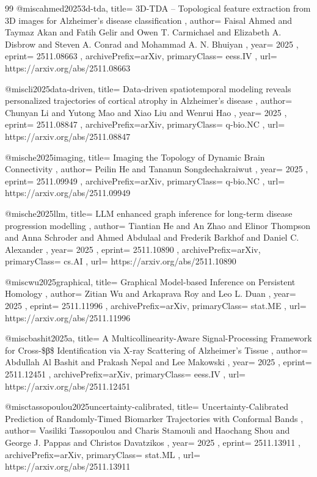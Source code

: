 \documentclass[11pt,a4paper]{article}
\begin{document}
\begin{thebibliography}{99}
@misc{ahmed20253d-tda,
  title={ 3D-TDA -- Topological feature extraction from 3D images for Alzheimer's disease classification },
  author={ Faisal Ahmed and Taymaz Akan and Fatih Gelir and Owen T. Carmichael and Elizabeth A. Disbrow and Steven A. Conrad and Mohammad A. N. Bhuiyan },
  year={ 2025 },
  eprint={ 2511.08663 },
  archivePrefix={arXiv},
  primaryClass={ eess.IV },
  url={ https://arxiv.org/abs/2511.08663 }
}


@misc{li2025data-driven,
  title={ Data-driven spatiotemporal modeling reveals personalized trajectories of cortical atrophy in Alzheimer's disease },
  author={ Chunyan Li and Yutong Mao and Xiao Liu and Wenrui Hao },
  year={ 2025 },
  eprint={ 2511.08847 },
  archivePrefix={arXiv},
  primaryClass={ q-bio.NC },
  url={ https://arxiv.org/abs/2511.08847 }
}


@misc{he2025imaging,
  title={ Imaging the Topology of Dynamic Brain Connectivity },
  author={ Peilin He and Tananun Songdechakraiwut },
  year={ 2025 },
  eprint={ 2511.09949 },
  archivePrefix={arXiv},
  primaryClass={ q-bio.NC },
  url={ https://arxiv.org/abs/2511.09949 }
}


@misc{he2025llm,
  title={ LLM enhanced graph inference for long-term disease progression modelling },
  author={ Tiantian He and An Zhao and Elinor Thompson and Anna Schroder and Ahmed Abdulaal and Frederik Barkhof and Daniel C. Alexander },
  year={ 2025 },
  eprint={ 2511.10890 },
  archivePrefix={arXiv},
  primaryClass={ cs.AI },
  url={ https://arxiv.org/abs/2511.10890 }
}


@misc{wu2025graphical,
  title={ Graphical Model-based Inference on Persistent Homology },
  author={ Zitian Wu and Arkaprava Roy and Leo L. Duan },
  year={ 2025 },
  eprint={ 2511.11996 },
  archivePrefix={arXiv},
  primaryClass={ stat.ME },
  url={ https://arxiv.org/abs/2511.11996 }
}


@misc{bashit2025a,
  title={ A Multicollinearity-Aware Signal-Processing Framework for Cross-\$β\$ Identification via X-ray Scattering of Alzheimer's Tissue },
  author={ Abdullah Al Bashit and Prakash Nepal and Lee Makowski },
  year={ 2025 },
  eprint={ 2511.12451 },
  archivePrefix={arXiv},
  primaryClass={ eess.IV },
  url={ https://arxiv.org/abs/2511.12451 }
}


@misc{tassopoulou2025uncertainty-calibrated,
  title={ Uncertainty-Calibrated Prediction of Randomly-Timed Biomarker Trajectories with Conformal Bands },
  author={ Vasiliki Tassopoulou and Charis Stamouli and Haochang Shou and George J. Pappas and Christos Davatzikos },
  year={ 2025 },
  eprint={ 2511.13911 },
  archivePrefix={arXiv},
  primaryClass={ stat.ML },
  url={ https://arxiv.org/abs/2511.13911 }
}



\end{thebibliography}
\end{document}
